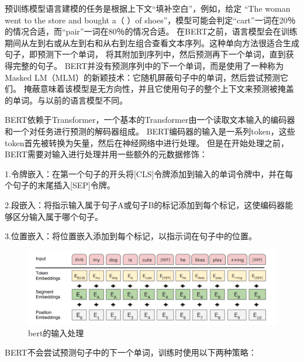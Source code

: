 预训练模型语言建模的任务是根据上下文“填补空白”，例如，给定
“The woman went to the store and bought a（ ）of shoes”，模型可能会判定“cart”一词在20％的情况合适，而“pair”一词在80％的情况合适。
在BERT之前，语言模型会在训练期间从左到右或从左到右和从右到左组合查看文本序列。这种单向方法很适合生成句子，即预测下一个单词，
将其附加到序列中，然后预测再下一个单词，直到获得完整的句子。
BERT并没有预测序列中的下一个单词，而是使用了一种称为Masked LM（MLM）的新颖技术：它随机屏蔽句子中的单词，然后尝试预测它们。
掩蔽意味着该模型是无方向性，并且它使用句子的整个上下文来预测被掩盖的单词。与以前的语言模型不同。


BERT依赖于Transformer，一个基本的Transformer由一个读取文本输入的编码器和一个对任务进行预测的解码器组成。
BERT编码器的输入是一系列token，这些token首先被转换为矢量，然后在神经网络中进行处理。
但是在开始处理之前，BERT需要对输入进行处理并用一些额外的元数据修饰：

1.令牌嵌入：在第一个句子的开头将[CLS]令牌添加到输入的单词令牌中，并在每个句子的末尾插入[SEP]令牌。

2.段嵌入：将指示输入属于句子A或句子B的标记添加到每个标记，这使编码器能够区分输入属于哪个句子。

3.位置嵌入：将位置嵌入添加到每个标记，以指示词在句子中的位置。
\begin{figure}[htbp]
  \centering
  \includegraphics[scale=0.5]{./images/inputBert.jpg}
  \caption{bert的输入处理\cite{devlin2018bert}}
  \label{fig:inputBert}
\end{figure}

BERT不会尝试预测句子中的下一个单词，训练时使用以下两种策略：


